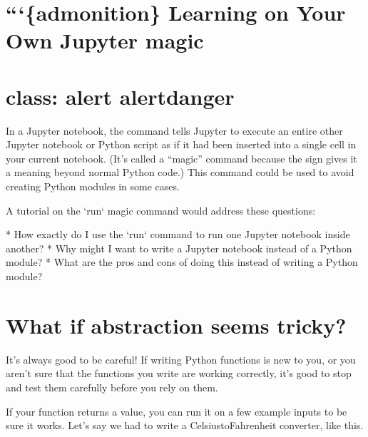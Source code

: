 \documentclass[letterpaper,10pt,english]{jupyterBook}
\begin{document}
\section{```\{admonition\} Learning on Your Own \sphinxhyphen{} Jupyter  magic}
\label{\detokenize{chapter-7-abstraction:admonition-learning-on-your-own-jupyter-run-magic}}

\section{class: alert alert\sphinxhyphen{}danger}
\label{\detokenize{chapter-7-abstraction:class-alert-alert-danger}}
\sphinxAtStartPar
In a Jupyter notebook, the  command tells Jupyter to execute an entire other Jupyter notebook or Python script as if it had been inserted into a single cell in your current notebook.  (It’s called a “magic” command because the \sphinxcode{\sphinxupquote{\%}} sign gives it a meaning beyond normal Python code.)  This command could be used to avoid creating Python modules in some cases.

\begin{sphinxVerbatim}[commandchars=\\\{\}]

A tutorial on the `\PYGZpc{}run` magic command would address these questions:

 * How exactly do I use the `\PYGZpc{}run` command to run one Jupyter notebook inside another?
 * Why might I want to write a Jupyter notebook instead of a Python module?
 * What are the pros and cons of doing this instead of writing a Python module?
\end{sphinxVerbatim}


\section{What if abstraction seems tricky?}
\label{\detokenize{chapter-7-abstraction:what-if-abstraction-seems-tricky}}
\sphinxAtStartPar
It’s always good to be careful!  If writing Python functions is new to you, or you aren’t sure that the functions you write are working correctly, it’s good to stop and test them carefully before you rely on them.

\sphinxAtStartPar
If your function returns a value, you can run it on a few example inputs to be sure it works.  Let’s say we had to write a Celsius\sphinxhyphen{}to\sphinxhyphen{}Fahrenheit converter, like this.
\end{document}
